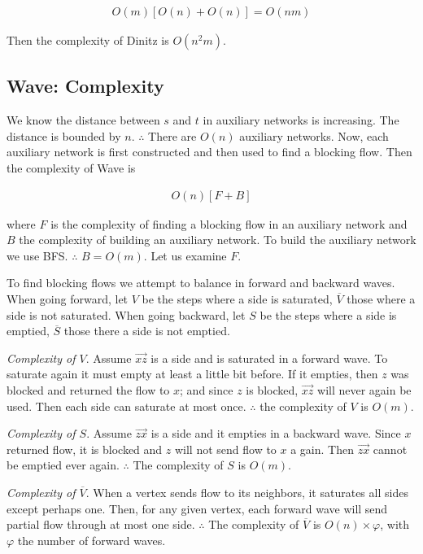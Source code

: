 \documentclass[a4paper]{article}
\begin{document}
\begin{align*}
    O(m) \left[ O(n) + O(n) \right]  = O(nm)
\end{align*}

Then the complexity of Dinitz is $O(n^2m)$.

\pagebreak

\subsection{Wave: Complexity}

We know the distance between $s$ and $t$ in auxiliary networks is increasing.
The distance is bounded by $n$. $\therefore $ There are $O(n)$ auxiliary
networks. Now, each auxiliary network is first constructed and then 
used to find a blocking flow. Then the complexity of Wave is 

\begin{align*}
    O(n) \left[ F + B \right] 
\end{align*}

where $F$ is the complexity of finding a blocking flow in an auxiliary network 
and $B$ the complexity of building an auxiliary network. To build the auxiliary 
network we use BFS. $\therefore  $ $B = O(m)$. Let us examine $F$.

To find blocking flows we attempt to balance in forward and backward waves.
When going forward, let $V$ be the steps where a side is saturated,
$\overline{V}$ those where a side is not saturated. When going 
backward, let $S$ be the steps where a side is emptied, $\overline{S}$ those 
there a side is not emptied. 

\textit{Complexity of $V$}. Assume $\overrightarrow{xz}$ is a side and is
saturated in a forward wave. To saturate again it must empty at least a little
bit before. If it empties, then $z$ was blocked and returned the flow to $x$;
and since $z$ is blocked, $\overrightarrow{xz}$ will never again be used. Then
each side can saturate at most once. $\therefore $ the complexity of $V$ is
$O(m)$.

\textit{Complexity of $S$}. Assume  $\overrightarrow{zx}$ is a side and 
it empties in a backward wave. Since $x$  returned flow, it 
is blocked and $z$ will not send flow to $x$ a gain. Then $\overrightarrow{zx}$
cannot be emptied ever again. $\therefore $ The complexity of $S$ is $O(m)$.

\textit{Complexity of $\overline{V}$}. When a vertex sends flow to 
its neighbors, it saturates all sides except perhaps one.
Then, for any given vertex, each forward wave will send 
partial flow through at most one side. $\therefore $ The 
complexity of $\overline{V}$ is $O(n) \times \varphi$, with 
$\varphi$ the number of forward waves.
\end{document}
